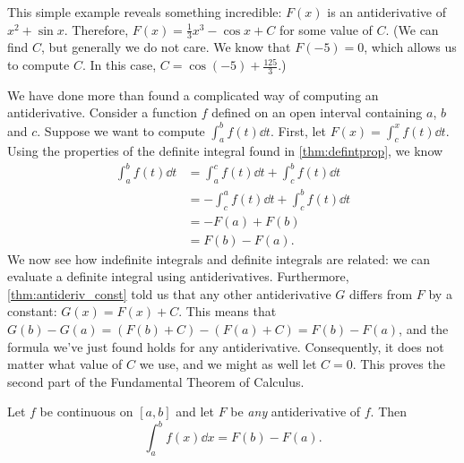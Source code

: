 This simple example reveals something incredible: $F(x)$ is an antiderivative of $x^2+\sin x$. Therefore, $F(x) = \frac13x^3-\cos x+C$ for some value of $C$. (We can find $C$, but generally we do not care. We know that $F(-5)=0$, which allows us to compute $C$. In this case, $C=\cos(-5)+\frac{125}3$.)

We have done more than found a complicated way of computing an antiderivative. Consider a function $f$ defined on an open interval containing $a$, $b$ and $c$. Suppose we want to compute $\int_a^b f(t)\dd t$. First, let $F(x) = \int_c^x f(t)\dd t$. Using the properties of the definite integral found in \autoref{thm:defintprop}, we know 
\begin{align*}
	\int_a^b f(t)\dd t
	&= \int_a^c f(t)\dd t + \int_c^b f(t)\dd t \\
	&= -\int_c^a f(t)\dd t + \int_c^b f(t)\dd t \\
	&=-F(a) + F(b)\\
	&= F(b) - F(a).
\end{align*}
We now see how indefinite integrals and definite integrals are related: we can evaluate a definite integral using antiderivatives.  Furthermore, \autoref{thm:antideriv_const} told us that any other antiderivative $G$ differs from $F$ by a constant: $G(x)=F(x)+C$.  This means that $G(b)-G(a)=(F(b)+C)-(F(a)+C)=F(b)-F(a)$, and the formula we've just found holds for any antiderivative.  Consequently, it does not matter what value of $C$ we use, and we might as well let $C=0$. This proves the second part of the Fundamental Theorem of Calculus.

\begin{theorem}\label{thm:FTC2}%
Let $f$ be continuous on $[a,b]$ and let $F$ be \emph{any} antiderivative of $f$. Then
\[\int_a^b f(x)\dd x = F(b) - F(a).\]
\end{theorem}


